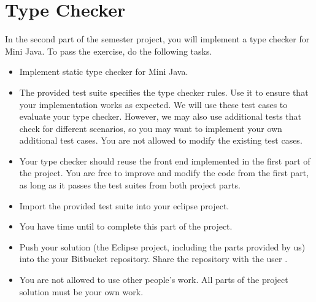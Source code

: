 

\subtitle{Semester project}



\makefancytitle

\setcounter{section}{1}
\section{Type Checker} 

In the second part of the semester project, you will implement a type checker for Mini Java. To pass the exercise, do the following tasks.

\begin{itemize} 

\item Implement static type checker for Mini Java.

\item The provided test suite specifies the type checker rules.
  Use it to ensure that your implementation works as expected.
  We will use these test cases to evaluate your type checker.
  However, we may also use additional tests that check for different scenarios, so you may want to implement your own additional test cases.
  You are not allowed to modify the existing test cases.

\item Your type checker should reuse the front end implemented in the first part of the project.
  You are free to improve and modify the code from the first part, as long as it passes the test suites from both project parts.

\item Import the provided test suite into your eclipse project.

\item You have time until  to complete this part of the project.

\item Push your solution (the Eclipse project, including the parts provided by us) into the your Bitbucket repository. Share the repository with the user . 

\item You are not allowed to use other people’s work.
  All parts of the project solution must be your own work.

\end{itemize}


